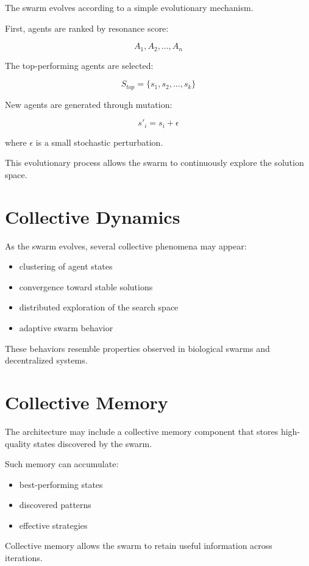 \documentclass[11pt]{article}
\begin{document}
The swarm evolves according to a simple evolutionary mechanism.

First, agents are ranked by resonance score:

\[
A_1, A_2, ..., A_n
\]

The top-performing agents are selected:

\[
S_{top} = \{s_1, s_2, ..., s_k\}
\]

New agents are generated through mutation:

\[
s'_i = s_i + \epsilon
\]

where \(\epsilon\) is a small stochastic perturbation.

This evolutionary process allows the swarm to continuously explore the solution space.

\section{Collective Dynamics}

As the swarm evolves, several collective phenomena may appear:

\begin{itemize}
\item clustering of agent states
\item convergence toward stable solutions
\item distributed exploration of the search space
\item adaptive swarm behavior
\end{itemize}

These behaviors resemble properties observed in biological swarms and decentralized systems.

\section{Collective Memory}

The architecture may include a collective memory component that stores high-quality states discovered by the swarm.

Such memory can accumulate:

\begin{itemize}
\item best-performing states
\item discovered patterns
\item effective strategies
\end{itemize}

Collective memory allows the swarm to retain useful information across iterations.
\end{document}
